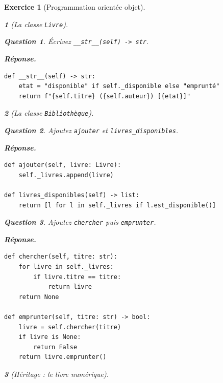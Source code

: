 \documentclass{article}
\theoremstyle{exostyle}
\newtheorem{exo}{Exercice}
\theoremstyle{partiestyle}
\newtheorem{partie}{}[exo]
\theoremstyle{questionstyle}
\newtheorem{questionpartie}{Question}[partie]
\newenvironment{reponse}{%
    \par\smallskip\noindent\textbf{Réponse.}\enspace\ignorespaces
}{%
    \par\smallskip
}
\begin{document}
\begin{exo}[Programmation orientée objet]
\begin{partie}[La classe \texttt{Livre}]
        \begin{questionpartie}
            Écrivez \texttt{\_\_str\_\_(self) -> str}.
        \end{questionpartie}
        \begin{reponse}
\begin{lstlisting}
def __str__(self) -> str:
    etat = "disponible" if self._disponible else "emprunté"
    return f"{self.titre} ({self.auteur}) [{etat}]"
\end{lstlisting}
        \end{reponse}

    \end{partie}

    \begin{partie}[La classe \texttt{Bibliothèque}]

        \begin{questionpartie}
            Ajoutez \texttt{ajouter} et \texttt{livres\_disponibles}.
        \end{questionpartie}
        \begin{reponse}
\begin{lstlisting}
def ajouter(self, livre: Livre):
    self._livres.append(livre)

def livres_disponibles(self) -> list:
    return [l for l in self._livres if l.est_disponible()]
\end{lstlisting}
        \end{reponse}

        \begin{questionpartie}
            Ajoutez \texttt{chercher} puis \texttt{emprunter}.
        \end{questionpartie}
        \begin{reponse}
\begin{lstlisting}
def chercher(self, titre: str):
    for livre in self._livres:
        if livre.titre == titre:
            return livre
    return None

def emprunter(self, titre: str) -> bool:
    livre = self.chercher(titre)
    if livre is None:
        return False
    return livre.emprunter()
\end{lstlisting}
        \end{reponse}

    \end{partie}

    \begin{partie}[Héritage : le livre numérique]


\end{partie}
\end{exo}
\end{document}
